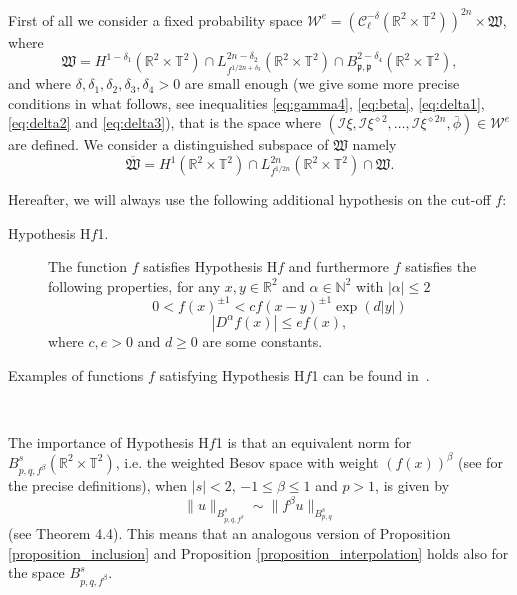 \documentclass[a4paper,10pt]{article}
\newcommand{\descriptionparagraphs}[1]{\begin{description}#1\end{description}}
\begin{document}
First of all we consider a fixed probability space $\mathcal{W}^e =
(\mathcal{C}^{- \delta}_{\ell} (\mathbb{R}^2 \times \mathbb{T}^2))^{2 n}
\times \mathfrak{W}$, where
\[ \mathfrak{W} = H^{1 - \delta_1} (\mathbb{R}^2 \times \mathbb{T}^2) \cap
   L^{2 n - \delta_2}_{f^{1 / 2 n + \delta_3}} (\mathbb{R}^2 \times
   \mathbb{T}^2) \cap B^{2 - \delta_4}_{\mathfrak{p}, \mathfrak{p}}
   (\mathbb{R}^2 \times \mathbb{T}^2), \]
and where $\delta, \delta_1, \delta_2, \delta_3, \delta_4 > 0$ are small
enough (we give some more precise conditions in what follows, see inequalities
{\eqref{eq:gamma4}}, {\eqref{eq:beta}}, {\eqref{eq:delta1}},
{\eqref{eq:delta2}} and {\eqref{eq:delta3}}), that is the space where
$(\mathcal{I} \xi, \mathcal{I} \xi^{\diamond 2}, \ldots, \mathcal{I}
\xi^{\diamond 2 n}, \bar{\phi}) \in \mathcal{W}^e$ are defined. We consider a
distinguished subspace of $\mathfrak{W}$ namely
\[ \overline{\mathfrak{W}} = H^1 (\mathbb{R}^2 \times \mathbb{T}^2) \cap L^{2
   n}_{f^{1 / 2 n}} (\mathbb{R}^2 \times \mathbb{T}^2) \cap \mathfrak{W} . \]

\begin{remark}
  \label{remark_f} Hereafter, we will always use the following additional
  hypothesis on the cut-off $f$:
{\descriptionparagraphs{  
  \item[Hypothesis H$f$1.] The function $f$ satisfies Hypothesis H$f$
  and furthermore $f$ satisfies the following properties, for any $x, y \in
  \mathbb{R}^2$ and $\alpha \in \mathbb{N}^2$ with $| \alpha | \leq 2$
  \[ 0 < f (x)^{\pm 1} < c f (x - y)^{\pm 1} \exp (d | y |) \]
  \[ | D^{\alpha} f (x) | \leqslant e f (x), \]
  where $c, e > 0$ and $d \geqslant 0$ are some constants.
 }}
  Examples of functions $f$ satisfying Hypothesis H$f$1 can be found
  in~{\cite{Klein1984}}.
  
  \
  
  The importance of Hypothesis H$f$1 is that an equivalent norm for $B^s_{p,
  q, f^{\beta}} (\mathbb{R}^2 \times \mathbb{T}^2)$, i.e. the weighted Besov
  space with weight $(f (x))^{\beta}$ (see {\cite{Schott1,Schott2}} for the
  precise definitions), when $| s | < 2$, $- 1 \leqslant \beta \leqslant 1$
  and $p > 1$, is given by
  \[ \| u \|_{B^s_{p, q, f^{\beta}}} \sim \| f^{\beta} u \|_{B^s_{p, q}} \]
  (see {\cite{Schott2}} Theorem 4.4). This means that an analogous version of
  Proposition \ref{proposition_inclusion} and Proposition
  \ref{proposition_interpolation} holds also for the space $B^s_{p, q,
  f^{\beta}}$. \ 
\end{remark}
\end{document}
